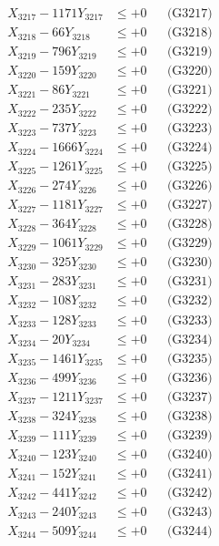 \documentclass[a4paper,10pt]{article}
\begin{document}
{\begin{align}
X_{3217} - 1171Y_{3217} &\leq +0 && \text{(G3217)} \\
X_{3218} - 66Y_{3218} &\leq +0 && \text{(G3218)} \\
X_{3219} - 796Y_{3219} &\leq +0 && \text{(G3219)} \\
X_{3220} - 159Y_{3220} &\leq +0 && \text{(G3220)} \\
\allowbreak
X_{3221} - 86Y_{3221} &\leq +0 && \text{(G3221)} \\
X_{3222} - 235Y_{3222} &\leq +0 && \text{(G3222)} \\
X_{3223} - 737Y_{3223} &\leq +0 && \text{(G3223)} \\
X_{3224} - 1666Y_{3224} &\leq +0 && \text{(G3224)} \\
X_{3225} - 1261Y_{3225} &\leq +0 && \text{(G3225)} \\
X_{3226} - 274Y_{3226} &\leq +0 && \text{(G3226)} \\
X_{3227} - 1181Y_{3227} &\leq +0 && \text{(G3227)} \\
X_{3228} - 364Y_{3228} &\leq +0 && \text{(G3228)} \\
X_{3229} - 1061Y_{3229} &\leq +0 && \text{(G3229)} \\
X_{3230} - 325Y_{3230} &\leq +0 && \text{(G3230)} \\
\allowbreak
X_{3231} - 283Y_{3231} &\leq +0 && \text{(G3231)} \\
X_{3232} - 108Y_{3232} &\leq +0 && \text{(G3232)} \\
X_{3233} - 128Y_{3233} &\leq +0 && \text{(G3233)} \\
X_{3234} - 20Y_{3234} &\leq +0 && \text{(G3234)} \\
X_{3235} - 1461Y_{3235} &\leq +0 && \text{(G3235)} \\
X_{3236} - 499Y_{3236} &\leq +0 && \text{(G3236)} \\
X_{3237} - 1211Y_{3237} &\leq +0 && \text{(G3237)} \\
X_{3238} - 324Y_{3238} &\leq +0 && \text{(G3238)} \\
X_{3239} - 111Y_{3239} &\leq +0 && \text{(G3239)} \\
X_{3240} - 123Y_{3240} &\leq +0 && \text{(G3240)} \\
\allowbreak
X_{3241} - 152Y_{3241} &\leq +0 && \text{(G3241)} \\
X_{3242} - 441Y_{3242} &\leq +0 && \text{(G3242)} \\
X_{3243} - 240Y_{3243} &\leq +0 && \text{(G3243)} \\
X_{3244} - 509Y_{3244} &\leq +0 && \text{(G3244)} \\

\end{align}}
\end{document}
